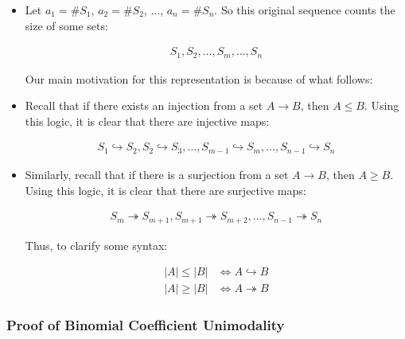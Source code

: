 \documentclass{report}
\begin{document}
\begin{itemize}
    \item Let $a_1 = \#S_1$, $a_2 = \#S_2$, $\dots$, $a_n = \#S_n$. So this original sequence counts the size
          of some sets:

          \begin{align*}
              S_1, S_2, \dots, S_m, \dots, S_n
          \end{align*}

          Our main motivation for this representation is because of what follows:

    \item Recall that if there exists an injection from a set $A \to B$, then $A \le B$. Using this logic,
          it is clear that there are injective maps:

          \begin{align*}
              S_1 \hookrightarrow S_2, S_2 \hookrightarrow S_3, \dots, S_{m-1} \hookrightarrow S_m, \dots, S_{n-1} \hookrightarrow S_n
          \end{align*}

    \item Similarly, recall that if there is a surjection from a set $A \to B$, then $A \ge B$. Using
          this logic, it is clear that there are surjective maps:

          \begin{align*}
              S_m \twoheadrightarrow S_{m+1}, S_{m+1} \twoheadrightarrow S_{m+2}, \dots, S_{n-1} \twoheadrightarrow S_n
          \end{align*}

          Thus, to clarify some syntax:

          \begin{align*}
              |A| \le |B| & \iff A \hookrightarrow B    \\
              |A| \ge |B| & \iff A \twoheadrightarrow B
          \end{align*}
\end{itemize}

\subsubsection*{Proof of Binomial Coefficient Unimodality}
\end{document}
